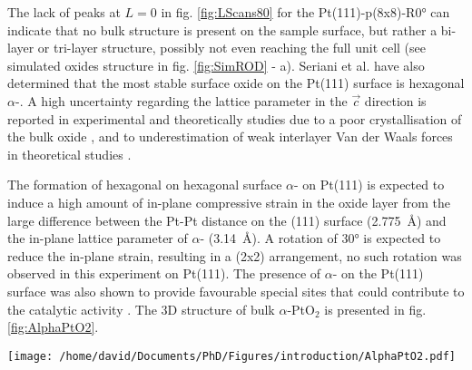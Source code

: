The lack of peaks at $L=0$ in fig. \ref{fig:LScans80} for the Pt(111)-p(8x8)-R\ang{0} can indicate that no bulk structure is present on the sample surface, but rather a bi-layer or tri-layer structure, possibly not even reaching the full unit cell (see simulated oxides structure in fig. \ref{fig:SimROD} - a).
Seriani et al. \parencite*{Seriani2006} have also determined that the most stable surface oxide on the Pt(111) surface is hexagonal $\alpha$-.
A high uncertainty regarding the lattice parameter in the $\vec{c}$ direction is reported in experimental and theoretically studies due to a poor crystallisation of the bulk oxide \parencite{Muller1968}, and to underestimation of weak interlayer Van der Waals forces in theoretical studies \parencite{Li2005}.

The formation of hexagonal on hexagonal surface $\alpha$- on Pt(111) is expected to induce a high amount of in-plane compressive strain in the oxide layer from the large difference between the Pt-Pt distance on the (111) surface (\qty{2.775}{\angstrom}) and the in-plane lattice parameter of $\alpha$- (\qty{3.14}{\angstrom}).
A rotation of \ang{30} is expected to reduce the in-plane strain, resulting in a (2x2) arrangement, no such rotation was observed in this experiment on Pt(111).
The presence of $\alpha$- on the Pt(111) surface was also shown to provide favourable special sites that could contribute to the catalytic activity \parencite{Li2005}.
The 3D structure of bulk $\alpha$-PtO$_2$ is presented in fig. \ref{fig:AlphaPtO2}.

\begin{SCfigure}
    \centering
    \texttt{[image: /home/david/Documents/PhD/Figures/introduction/AlphaPtO2.pdf]}
    \caption{
        $\alpha$- bulk unit cell.
        Platinum atoms are situated on the unit cell corners while the two oxygen atoms are at the positions $(1/3, 2/3, 1/4)$ and $(2/3, 1/3, 3/4)$.
    }
    \label{fig:AlphaPtO2}
\end{SCfigure}

